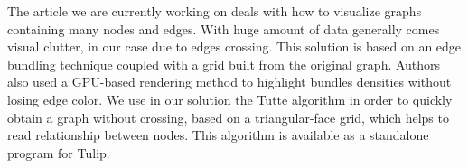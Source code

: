 The article we are currently working on deals with how to visualize graphs containing many nodes and edges. With huge amount of data generally comes visual clutter, in our case due to edges crossing. This solution is based on an edge bundling technique coupled with a grid built from the original graph. Authors also used a GPU-based rendering method to highlight bundles densities without losing edge color. We use in our solution the Tutte algorithm in order to quickly obtain a graph without crossing, based on a triangular-face grid, which helps to read relationship between nodes. This algorithm is available as a standalone program for Tulip. 
